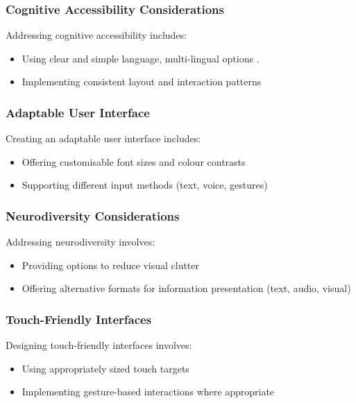 \documentclass[14pt,a4paper]{article}
\begin{document}
\begin{multicols}{2}
\subsubsection*{Cognitive Accessibility Considerations}
Addressing cognitive accessibility \textit{\parencite[pp. 1-10]{Yesilada2023}} includes:
\begin{itemize}
    \item Using clear and simple language, multi-lingual options \textit{\parencite[pp. 50-100]{AnastasiouSchaler2023}}.
    \item Implementing consistent layout and interaction patterns
\end{itemize}

\subsubsection*{Adaptable User Interface}
Creating an adaptable user interface \textit{\parencite[pp. 20-50]{HarperYesilada2024}} includes:
\begin{itemize}
    \item Offering customisable font sizes and colour contrasts
    \item Supporting different input methods (text, voice, gestures)
\end{itemize}

\subsubsection*{Neurodiversity Considerations}
Addressing neurodiversity \textit{\parencite[pp. 30-60]{Armstrong2023}} involves:
\begin{itemize}
    \item Providing options to reduce visual clutter
    \item Offering alternative formats for information presentation (text, audio, visual)
\end{itemize}

\subsubsection*{Touch-Friendly Interfaces}
Designing touch-friendly interfaces \textit{\parencite[pp. 80-120]{HooberBerkman2023}} involves:
\begin{itemize}
    \item Using appropriately sized touch targets
    \item Implementing gesture-based interactions where appropriate
\end{itemize}



\end{multicols}
\end{document}
